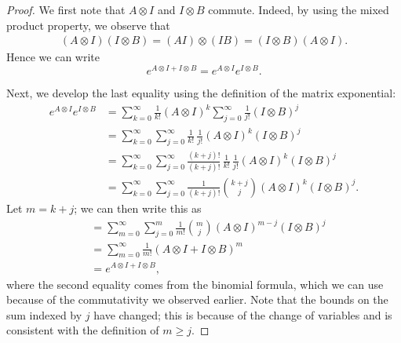 \documentclass[11pt]{article}
\newcommand{\kp}{\otimes} %
\begin{document}
\begin{proof}
We first note that $A\kp I$ and $I\kp B$ commute.
Indeed, by using the mixed product property, we observe that
\begin{align*}
    (A\kp I)(I\kp B)=(AI)\kp(IB)=(I\kp B)(A\kp I).
\end{align*}
Hence we can write
\begin{equation*}
    e^{A\kp I+I\kp B}=e^{A\kp I}e^{I\kp B}.
\end{equation*}

Next, we develop the last equality using the definition of the matrix exponential:
\begin{align*}
    e^{A\kp I}e^{I\kp B}&=\sum_{k=0}^{\infty}\frac{1}{k!}(A\kp I)^k \sum_{j=0}^{\infty}\frac{1}{j!}(I\kp B)^j\\
    &=\sum_{k=0}^{\infty}\sum_{j=0}^{\infty}\frac{1}{k!}\,\frac{1}{j!}(A\kp I)^k (I\kp B)^j\\
    &=\sum_{k=0}^{\infty}\sum_{j=0}^{\infty}\frac{(k+j)!}{(k+j)!}\,\frac{1}{k!}\,\frac{1}{j!}(A\kp I)^k (I\kp B)^j\\
    &=\sum_{k=0}^{\infty}\sum_{j=0}^{\infty}\frac{1}{(k+j)!}\binom{k+j}{j}(A\kp I)^k (I\kp B)^j.
\end{align*}
Let $m=k+j$; we can then write this as
\begin{align*}
    &=\sum_{m=0}^{\infty} \sum_{j = 0}^m\frac{1}{m!}\binom{m}{j}(A\kp I)^{m-j} (I\kp B)^j\\
    &=\sum_{m=0}^{\infty}\frac{1}{m!}(A\kp I+I\kp B)^m\\
    &=e^{A\kp I+I\kp B},
\end{align*}
where the second equality comes from the binomial formula, which we can use because of the commutativity we observed earlier.
Note that the bounds on the sum indexed by \(j\) have changed; this is because of the change of variables and is consistent with the definition of \(m \geqslant j\).
\end{proof}
\end{document}
